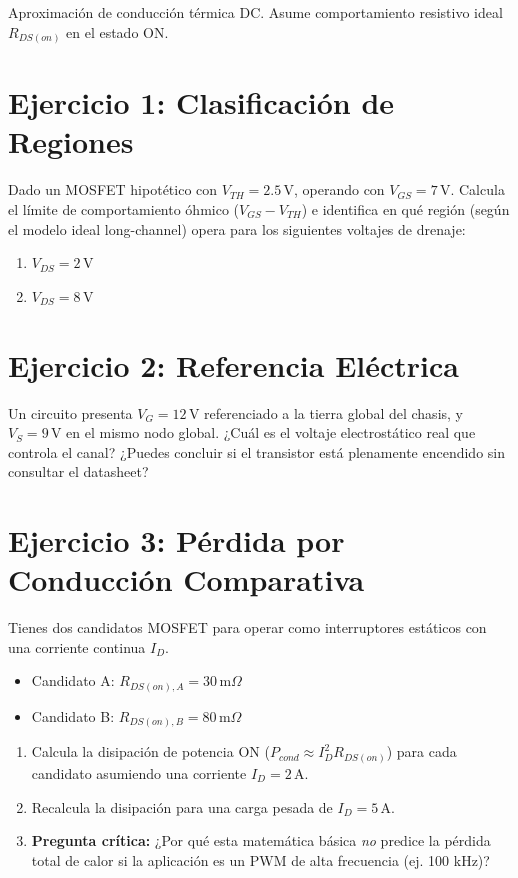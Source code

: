 \documentclass[11pt, a4paper]{article}
\begin{document}
\begin{tcolorbox}[colback=ucbblue!5, colframe=ucbblue, title=\textbf{Hoja de Ejercicios: Estimación de Pérdidas de Primer Orden (MOSFET)}]
    Aproximación de conducción térmica DC. Asume comportamiento resistivo ideal $R_{DS(on)}$ en el estado ON.
\end{tcolorbox}

\section*{Ejercicio 1: Clasificación de Regiones}
Dado un MOSFET hipotético con $V_{TH} = 2.5\,\text{V}$, operando con $V_{GS} = 7\,\text{V}$.
Calcula el límite de comportamiento óhmico ($V_{GS} - V_{TH}$) e identifica en qué región (según el modelo ideal long-channel) opera para los siguientes voltajes de drenaje:
\begin{enumerate}
    \item $V_{DS} = 2\,\text{V}$
    \item $V_{DS} = 8\,\text{V}$
\end{enumerate}

\section*{Ejercicio 2: Referencia Eléctrica}
Un circuito presenta $V_G = 12\,\text{V}$ referenciado a la tierra global del chasis, y $V_S = 9\,\text{V}$ en el mismo nodo global. ¿Cuál es el voltaje electrostático real que controla el canal? ¿Puedes concluir si el transistor está plenamente encendido sin consultar el datasheet?

\section*{Ejercicio 3: Pérdida por Conducción Comparativa}
Tienes dos candidatos MOSFET para operar como interruptores estáticos con una corriente continua $I_D$.
\begin{itemize}
    \item Candidato A: $R_{DS(on),A} = 30\,\text{m}\Omega$
    \item Candidato B: $R_{DS(on),B} = 80\,\text{m}\Omega$
\end{itemize}
\begin{enumerate}
    \item Calcula la disipación de potencia ON ($P_{cond} \approx I_D^2 R_{DS(on)}$) para cada candidato asumiendo una corriente $I_D = 2\,\text{A}$.
    \item Recalcula la disipación para una carga pesada de $I_D = 5\,\text{A}$.
    \item \textbf{Pregunta crítica:} ¿Por qué esta matemática básica \textit{no} predice la pérdida total de calor si la aplicación es un PWM de alta frecuencia (ej. 100 kHz)?
\end{enumerate}
\end{document}
